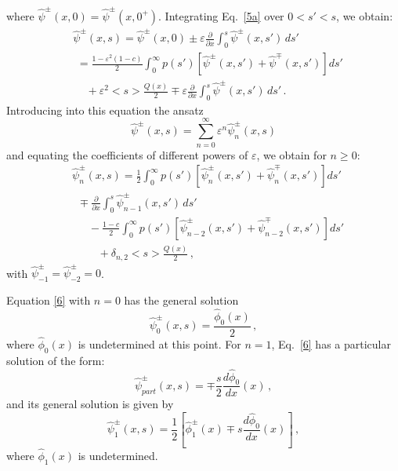 \documentclass{anstrans}
\newcommand{\bl}{\big<}
\newcommand{\bg}{\big>}
\newcommand{\eps}{\varepsilon}
\begin{document}
where $\hat\psi^\pm(x,0) = \hat\psi^\pm(x,0^+)$. Integrating Eq.\ \eqref{5a} over $0 < s' < s$, we obtain:
   \begin{align}
      &\hat\psi^\pm( x, s)  = \hat\psi^\pm(x, 0) \pm \varepsilon \frac{\partial}{\partial x} \int_0^s \hat\psi^\pm(x, s') \, ds' \nonumber\\
      & \,\, = \frac{1-\eps^2(1-c)}{2} \int_0^{\infty} p(s')
\left[\hat\psi^\pm(x,s')+\hat\psi^\mp(x, s')\right] ds'  \nonumber\\
         &\,\,\,\,\,\,\, + \varepsilon^2 \bl s\bg \frac{Q(x)}{2} \mp \varepsilon\frac{\partial}{\partial x} \int_0^s \hat\psi^\pm(x, s') \, ds' \,.\nonumber
   \end{align}
Introducing into this equation the ansatz 
   \begin{equation}
 \hat\psi^\pm(x, s) =  \sum_{n=0}^{\infty} \varepsilon^n
       \hat\psi_n^\pm(x, s) \nonumber
       \end{equation}
and equating the coefficients of different powers of $\varepsilon$, we obtain for $n \ge 0$:
   \begin{align}
&      \hat\psi_n^\pm(x, s)  = \frac{1}{2}\int_0^{\infty} p(s')\left[
\hat\psi_n^\pm(x, s')+\hat\psi_n^\mp(x,s')\right] ds' \label{6}\\
&\,\,\, \mp \frac{\partial}{\partial x} \int_0^s \hat\psi_{n-1}^\pm(x, s') \, ds' \nonumber \\
& \,\,\,\,\,\,\,\,\, -\frac{1-c}{2}\int_0^{\infty} p(s')\left[
\hat\psi_{n-2}^\pm(x, s')+\hat\psi_{n-2}^\mp(x,s')\right] ds'  \nonumber\\   
      & \,\,\,\,\,\,\,\,\,\,\,\,\,\,+ \delta_{n,2} \bl s\bg \frac{Q( x)}{2} \,, 
   \nonumber
   \end{align}
with $\hat\psi_{-1}^\pm=\hat\psi_{-2}^\pm=0$.


 Equation \eqref{6} with $n=0$ has the general solution
   \begin{equation}
      \hat\psi_0^\pm(x, s) = \frac{\hat\phi_0(x)}{2} \,, \nonumber
   \end{equation}
where $\hat\phi_0(x)$ is undetermined at this point. For $n=1$,
Eq.\ \eqref{6} has a particular solution of the form:
    \begin{equation}
      \hat\psi_{part}^\pm(x,s) = \mp \frac{s}{2}\frac{d \hat\phi_0}{d x}(x) \,,\nonumber
   \end{equation}   
and its general solution is given by 
   \begin{equation}
      \hat\psi_1^\pm( x, s) =  \frac{1}{2}\left[\hat\phi_1^\pm( x) \mp s\frac{d \hat\phi_0}{d x}(x)\right] \,,\nonumber
   \label{eq17}
  \end{equation}  
where $\hat\phi_1(x)$ is undetermined.
\end{document}
